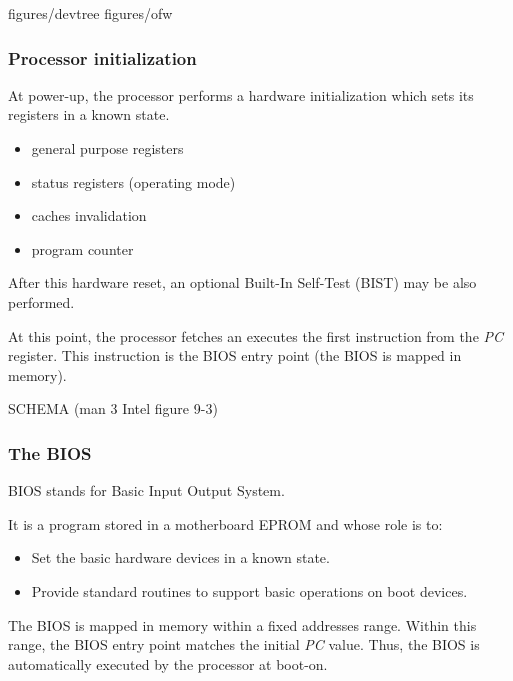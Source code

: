 
%
%

%


		{figures/devtree}
		{figures/ofw}

%
%

\begin{frame}
  \frametitle{Processor initialization}

  At power-up, the processor performs a hardware initialization which sets its registers in a known state.

  \-

  \begin{itemize}
  \item general purpose registers
  \item status registers (operating mode)
  \item caches invalidation
  \item program counter
  \end{itemize}

  \-

  After this hardware reset, an optional Built-In Self-Test (BIST) may be also performed.

  \-

  At this point, the processor fetches an executes the first instruction from the {\em PC} register. This instruction is the BIOS entry point (the BIOS is mapped in memory).

  \-

  SCHEMA (man 3 Intel figure 9-3)

\end{frame}

%
%
%

\begin{frame}
  \frametitle{The BIOS}

  BIOS stands for Basic Input Output System.

  \-

  It is a program stored in a motherboard EPROM and whose role is to:
  \begin{itemize}
  \item Set the basic hardware devices in a known state.
  \item Provide standard routines to support basic operations on boot devices.
  \end{itemize}

  \-

  The BIOS is mapped in memory within a fixed addresses range. Within this range, the BIOS entry point matches the initial {\em PC} value. Thus, the BIOS is automatically executed by the processor at boot-on.

\end{frame}

